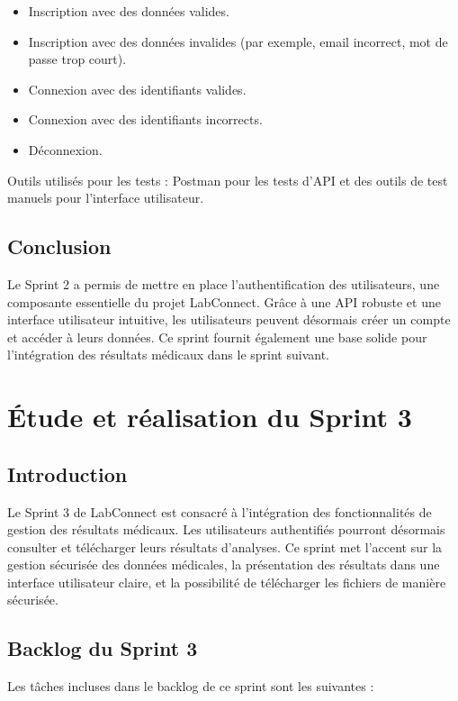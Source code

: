 \documentclass[12pt,a4paper]{report}
\begin{document}
\begin{itemize}
    \item Inscription avec des données valides.
    \item Inscription avec des données invalides (par exemple, email incorrect, mot de passe trop court).
    \item Connexion avec des identifiants valides.
    \item Connexion avec des identifiants incorrects.
    \item Déconnexion.
\end{itemize}

Outils utilisés pour les tests : Postman pour les tests d'API et des outils de test manuels pour l'interface utilisateur.

\section{Conclusion}

Le Sprint 2 a permis de mettre en place l’authentification des utilisateurs, une composante essentielle du projet LabConnect. Grâce à une API robuste et une interface utilisateur intuitive, les utilisateurs peuvent désormais créer un compte et accéder à leurs données. Ce sprint fournit également une base solide pour l’intégration des résultats médicaux dans le sprint suivant.
\chapter{Étude et réalisation du Sprint 3}

\section{Introduction}

Le Sprint 3 de LabConnect est consacré à l'intégration des fonctionnalités de gestion des résultats médicaux. Les utilisateurs authentifiés pourront désormais consulter et télécharger leurs résultats d'analyses. Ce sprint met l'accent sur la gestion sécurisée des données médicales, la présentation des résultats dans une interface utilisateur claire, et la possibilité de télécharger les fichiers de manière sécurisée.

\section{Backlog du Sprint 3}

Les tâches incluses dans le backlog de ce sprint sont les suivantes :
\end{document}
